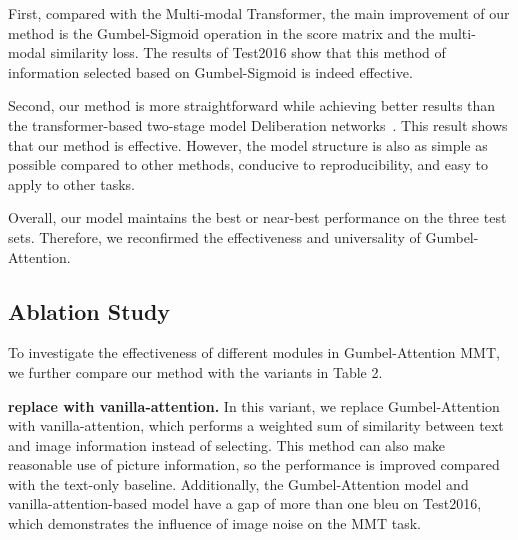 \documentclass[11pt]{article}
\begin{document}
First, compared with the Multi-modal Transformer, the main improvement of our method is the Gumbel-Sigmoid operation in the score matrix and the multi-modal similarity loss. The results of Test2016 show that this method of information selected based on Gumbel-Sigmoid is indeed effective.  


Second, our method is more straightforward while achieving better results than the transformer-based two-stage model Deliberation networks~\citep{DBLP:conf/acl/IveMS19}. This result shows that our method is effective. However, the model structure is also as simple as possible compared to other methods, conducive to reproducibility, and easy to apply to other tasks.

Overall, our model maintains the best or near-best performance on the three test sets. Therefore, we reconfirmed the effectiveness and universality of Gumbel-Attention.




\subsection{Ablation Study}

\begin{table}
\centering
{}
\caption{Ablation study of our model on Test2016}
\label{tab:plain}
\end{table}


To investigate the effectiveness of different modules in Gumbel-Attention MMT, we further compare our method with the variants in Table 2.

\textbf{replace with vanilla-attention.} 
In this variant, we replace Gumbel-Attention with vanilla-attention, which performs a weighted sum of similarity between text and image information instead of selecting. This method can also make reasonable use of picture information, so the performance is improved compared with the text-only baseline. Additionally, the Gumbel-Attention model and vanilla-attention-based model have a gap of more than one bleu on Test2016, which demonstrates the influence of image noise on the MMT task.
\end{document}

